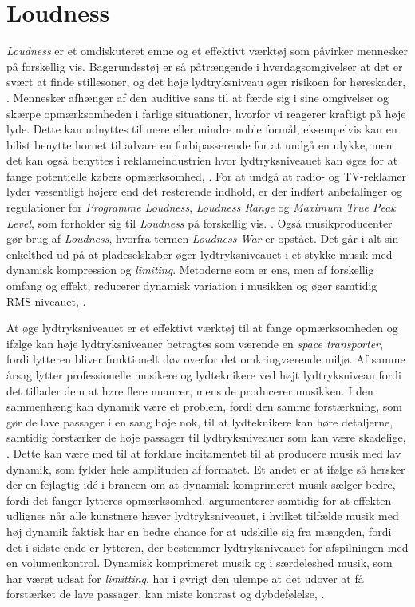 \chapter{Loudness}
\label{Loudness}
\noindent
\textit{Loudness} er et omdiskuteret emne og et effektivt værktøj som påvirker mennesker på forskellig vis. Baggrundsstøj er så påtrængende i hverdagsomgivelser at det er svært at finde stillesoner, og det høje lydtryksniveau øger risikoen for høreskader, \parencites[ss. 1-2]{BOOK:Loudness}. Mennesker afhænger af den auditive sans til at færde sig i sine omgivelser og skærpe opmærksomheden i farlige situationer, hvorfor vi reagerer kraftigt på høje lyde. Dette kan udnyttes til mere eller mindre noble formål, eksempelvis kan en bilist benytte hornet til advare en forbipasserende for at undgå en ulykke, men det kan også benyttes i reklameindustrien hvor lydtryksniveauet kan øges for at fange potentielle købers opmærksomhed, \parencite[s. 3]{BOOK:Loudness}. For at undgå at radio- og TV-reklamer lyder væsentligt højere end det resterende indhold, er der indført anbefalinger og regulationer for \textit{Programme Loudness}, \textit{Loudness Range} og \textit{Maximum True Peak Level}, som forholder sig til \textit{Loudness} på forskellig vis. \parencite{STD:R108}.
\blankline
Også musikproducenter gør brug af \textit{Loudness}, hvorfra termen \textit{Loudness War} er opstået. Det går i alt sin enkelthed ud på at pladeselskaber øger lydtryksniveauet i et stykke musik med dynamisk kompression og \textit{limiting}. Metoderne som er ens, men af forskellig omfang og effekt, reducerer dynamisk variation i musikken og øger samtidig RMS-niveauet, \parencite[s. 1177]{PDF:QualityAndLoudnessJudgements}.\par
At øge lydtryksniveauet er et effektivt værktøj til at fange opmærksomheden og ifølge \textcite[s. 3]{PDF:TheSeductiveAppealofLoudMusic} kan høje lydtryksniveauer betragtes som værende en \textit{space transporter}, fordi lytteren bliver funktionelt døv overfor det omkringværende miljø. Af samme årsag lytter professionelle musikere og lydteknikere ved højt lydtryksniveau fordi det tillader dem at høre flere nuancer, mens de producerer musikken. I den sammenhæng kan dynamik være et problem, fordi den samme forstærkning, som gør de lave passager i en sang høje nok, til at lydteknikere kan høre detaljerne, samtidig forstærker de høje passager til lydtryksniveauer som kan være skadelige, \parencite[s. 4]{PDF:TheSeductiveAppealofLoudMusic}. Dette kan være med til at forklare incitamentet til at producere musik med lav dynamik, som fylder hele amplituden af formatet. Et andet er at ifølge \textcite{WEB:LoudnessWarSecret} så hersker der en fejlagtig idé i brancen om at dynamisk komprimeret musik sælger bedre, fordi det fanger lytteres opmærksomhed. \textcite{WEB:LoudnessWarSecret} argumenterer samtidig for at effekten udlignes når alle kunstnere hæver lydtryksniveauet, i hvilket tilfælde musik med høj dynamik faktisk har en bedre chance for at udskille sig fra mængden, fordi det i sidste ende er lytteren, der bestemmer lydtryksniveauet for afspilningen med en volumenkontrol. Dynamisk komprimeret musik og i særdeleshed musik, som har været udsat for \textit{limitting}, har i øvrigt den ulempe at det udover at få forstærket de lave passager, kan miste kontrast og dybdefølelse, \parencite{WEB:WhatIsTheLoudnessWar}.
